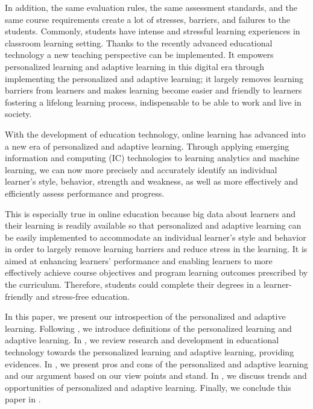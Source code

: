 \documentclass[english]{textolivre}
\begin{document}
In addition, the same evaluation rules, the same assessment standards, and the same course requirements create a lot of stresses, barriers, and failures to the students. Commonly, students have intense and stressful learning experiences in classroom learning setting. Thanks to the recently advanced educational technology a new teaching perspective can be implemented. It empowers personalized learning and adaptive learning in this digital era through implementing the personalized and adaptive learning; it largely removes learning barriers from learners and makes learning become easier and friendly to learners fostering a lifelong learning process, indispensable to be able to work and live in society.

With the development of education technology, online learning has advanced into a new era of personalized and adaptive learning. Through applying emerging information and computing (IC) technologies to learning analytics and machine learning, we can now more precisely and accurately identify an individual learner’s style, behavior, strength and weakness, as well as more effectively and efficiently assess performance and progress.

This is especially true in online education because big data about learners and their learning is readily available so that personalized and adaptive learning can be easily implemented to accommodate an individual learner’s style and behavior in order to largely remove learning barriers and reduce stress in the learning. It is aimed at enhancing learners’ performance and enabling learners to more effectively achieve course objectives and program learning outcomes prescribed by the curriculum. Therefore, students could complete their degrees in a learner-friendly and stress-free education.

In this paper, we present our introspection of the personalized and adaptive learning. Following ,
we introduce definitions of the personalized learning and adaptive learning. In , we review research and development in educational technology towards the personalized learning and adaptive learning, providing evidences. In , we present pros and cons of the personalized and adaptive learning and our argument based on our view points and stand. In , we discuss trends and opportunities of personalized and adaptive learning. Finally, we conclude this paper in .
\end{document}
